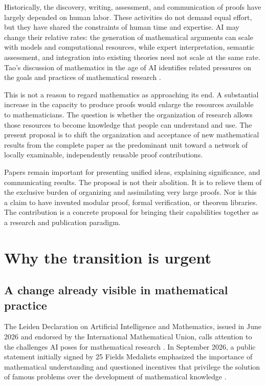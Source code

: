 \documentclass[11pt,a4paper]{article}
\theoremstyle{definition}\newtheorem{definition}{Definition}
\begin{document}
Historically, the discovery, writing, assessment, and communication of proofs have largely depended on human labor. These activities do not demand equal effort, but they have shared the constraints of human time and expertise. AI may change their relative rates: the generation of mathematical arguments can scale with models and computational resources, while expert interpretation, semantic assessment, and integration into existing theories need not scale at the same rate. Tao's discussion of mathematics in the age of AI identifies related pressures on the goals and practices of mathematical research \cite{tao}.

This is not a reason to regard mathematics as approaching its end. A substantial increase in the capacity to produce proofs would enlarge the resources available to mathematicians. The question is whether the organization of research allows those resources to become knowledge that people can understand and use. The present proposal is to shift the organization and acceptance of new mathematical results from the complete paper as the predominant unit toward a network of locally examinable, independently reusable proof contributions.

Papers remain important for presenting unified ideas, explaining significance, and communicating results. The proposal is not their abolition. It is to relieve them of the exclusive burden of organizing and assimilating very large proofs. Nor is this a claim to have invented modular proof, formal verification, or theorem libraries. The contribution is a concrete proposal for bringing their capabilities together as a research and publication paradigm.

\section{Why the transition is urgent}
\subsection{A change already visible in mathematical practice}
The Leiden Declaration on Artificial Intelligence and Mathematics, issued in June 2026 and endorsed by the International Mathematical Union, calls attention to the challenges AI poses for mathematical research \cite{leiden}. In September 2026, a public statement initially signed by 25 Fields Medalists emphasized the importance of mathematical understanding and questioned incentives that privilege the solution of famous problems over the development of mathematical knowledge \cite{fields}.
\end{document}
